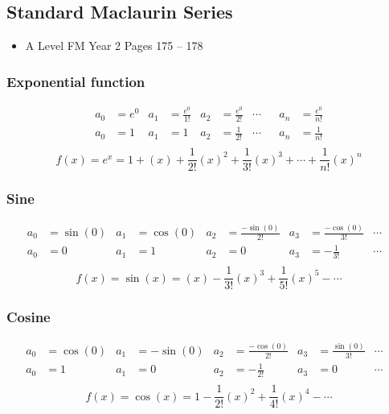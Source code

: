 \documentclass[11pt, a4paper]{article}
\begin{document}
\subsection{Standard Maclaurin Series}
\label{standardmaclaurin}
\begin{itemize}
\item A Level FM Year 2 \hspace{1cm} \phantom{AS /} Pages 175 -- 178
\end{itemize} \par
\subsubsection*{Exponential function}
\vspace{-.8cm}
\begin{align*}
a_{0}&=e^{0} & a_{1}&=\frac{e^{0}}{1!} & a_{2}&=\frac{e^{0}}{2!} & \cdots& & a_{n}&=\frac{e^{0}}{n!} \\
a_{0}&=1 & a_{1}&=1 & a_{2}&=\frac{1}{2!} & \cdots& & a_{n}&=\frac{1}{n!} \\
\end{align*}
\begin{equation*}
f(x)=e^{x}=1+(x)+\frac{1}{2!}(x)^{2}+\frac{1}{3!}(x)^{3}+\cdots+\frac{1}{n!}(x)^{n}
\end{equation*} \newline
\subsubsection*{Sine}
\vspace{-.8cm}
\begin{align*}
a_{0}&=\sin(0) & a_{1}&=\cos(0) & a_{2}&=\frac{-\sin(0)}{2!} & a_{3}&=\frac{-\cos(0)}{3!}& \cdots& \\
a_{0}&=0 & a_{1}&=1 & a_{2}&=0 & a_{3}&=-\frac{1}{3!} & \cdots& \\
\end{align*}
\begin{equation*}
f(x)=\sin(x)=(x)-\frac{1}{3!}(x)^{3}+\frac{1}{5!}(x)^{5}-\cdots
\end{equation*} \newline
\subsubsection*{Cosine}
\vspace{-.8cm}
\begin{align*}
a_{0}&=\cos(0) & a_{1}&=-\sin(0) & a_{2}&=\frac{-\cos(0)}{2!} & a_{3}&=\frac{\sin(0)}{3!}& \cdots& \\
a_{0}&=1 & a_{1}&=0 & a_{2}&=-\frac{1}{2!} & a_{3}&=0 & \cdots& \\
\end{align*}
\begin{equation*}
f(x)=\cos(x)=1-\frac{1}{2!}(x)^{2}+\frac{1}{4!}(x)^{4}-\cdots
\end{equation*} \newline
\end{document}
